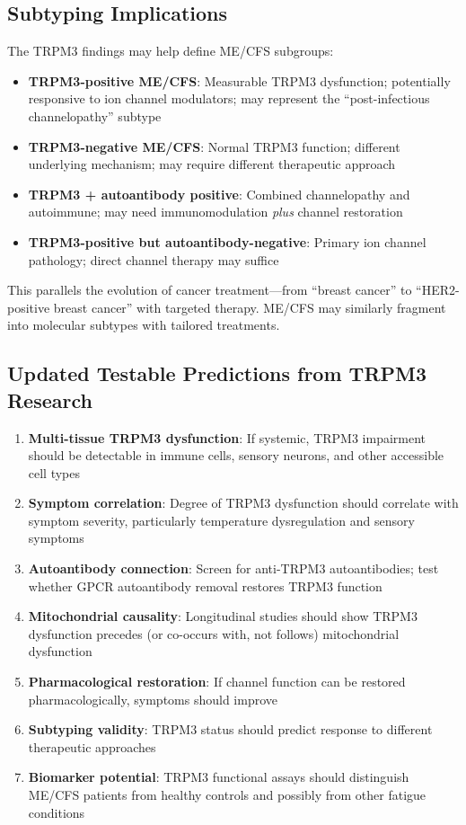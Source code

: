 \subsection{Subtyping Implications}

The TRPM3 findings may help define ME/CFS subgroups:

\begin{itemize}
    \item \textbf{TRPM3-positive ME/CFS}: Measurable TRPM3 dysfunction; potentially responsive to ion channel modulators; may represent the ``post-infectious channelopathy'' subtype
    \item \textbf{TRPM3-negative ME/CFS}: Normal TRPM3 function; different underlying mechanism; may require different therapeutic approach
    \item \textbf{TRPM3 + autoantibody positive}: Combined channelopathy and autoimmune; may need immunomodulation \textit{plus} channel restoration
    \item \textbf{TRPM3-positive but autoantibody-negative}: Primary ion channel pathology; direct channel therapy may suffice
\end{itemize}

This parallels the evolution of cancer treatment---from ``breast cancer'' to ``HER2-positive breast cancer'' with targeted therapy. ME/CFS may similarly fragment into molecular subtypes with tailored treatments.

\subsection{Updated Testable Predictions from TRPM3 Research}

\begin{enumerate}
    \item \textbf{Multi-tissue TRPM3 dysfunction}: If systemic, TRPM3 impairment should be detectable in immune cells, sensory neurons, and other accessible cell types
    \item \textbf{Symptom correlation}: Degree of TRPM3 dysfunction should correlate with symptom severity, particularly temperature dysregulation and sensory symptoms
    \item \textbf{Autoantibody connection}: Screen for anti-TRPM3 autoantibodies; test whether GPCR autoantibody removal restores TRPM3 function
    \item \textbf{Mitochondrial causality}: Longitudinal studies should show TRPM3 dysfunction precedes (or co-occurs with, not follows) mitochondrial dysfunction
    \item \textbf{Pharmacological restoration}: If channel function can be restored pharmacologically, symptoms should improve
    \item \textbf{Subtyping validity}: TRPM3 status should predict response to different therapeutic approaches
    \item \textbf{Biomarker potential}: TRPM3 functional assays should distinguish ME/CFS patients from healthy controls and possibly from other fatigue conditions
\end{enumerate}


